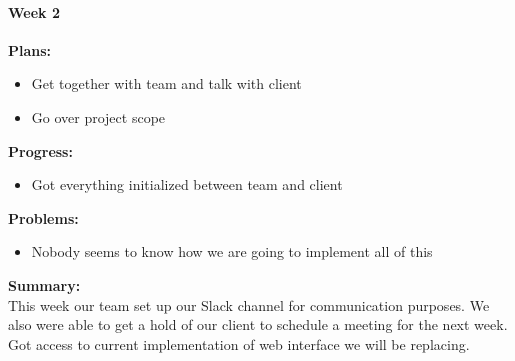 \paragraph{Week 2}
\begin{adjustwidth}{2.5em}{0pt}
    \vspace{-0.5cm}\textbf{Plans:}
    \vspace{-0.5cm}
    \begin{itemize}
        \item Get together with team and talk with client
        \item Go over project scope 
    \end{itemize} 
    \vspace{-0.3cm}\textbf{Progress:}
    \vspace{-0.5cm}
    \begin{itemize}
        \item Got everything initialized between team and client
    \end{itemize} 
    \vspace{-0.3cm}\textbf{Problems:}
    \vspace{-0.5cm}
    \begin{itemize}
        \item Nobody seems to know how we are going to implement all of this
    \end{itemize}  
    \vspace{-0.3cm}\noindent\textbf{Summary:}\\
    \noindent This week our team set up our Slack channel for communication purposes.  We also were able to get a hold of our client to schedule a meeting for the next week. Got access to current implementation of web interface we will be replacing. 
	\end{adjustwidth} 
